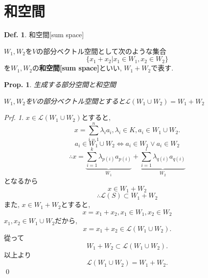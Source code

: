 \documentclass[a4paper,10pt,report]{amsart}
\theoremstyle{plain}
\newtheorem{prop}{Prop.}[section]
\theoremstyle{definition}
\newtheorem{defn}{Def.}[section]
\theoremstyle{remark}
\newtheorem{prf}{Prf.}
\begin{document}
\section{和空間}
\begin{leftbar}
    \begin{defn}和空間[sum space]\par
        \(W_{1},W_{2}\)を\(V\)の部分ベクトル空間として次のような集合
        \begin{equation}
            \{x_{1}+x_{2}|x_{1}\in W_{1},x_{2}\in W_{2}\}
        \end{equation}
        を\(W_{1},W_{2}\)の\textbf{和空間[sum space]}といい, \(W_{1}+W_{2}\)で表す.
    \end{defn}
\end{leftbar}
\begin{leftbar}
    \begin{prop}生成する部分空間と和空間\par
        \(W_{1},W_{2}\)を\(V\)の部分ベクトル空間とすると\(\mathcal{L}(W_{1}\cup{}W_{2})=W_{1}+W_{2} \)
    \end{prop}
\end{leftbar}
\begin{prf}
    \(x\in\mathcal{L}(W_{1}\cup W_{2})\)とすると, 
        \begin{equation*}
            x=\sum_{i=1}^{n}\lambda_{i}a_{i},\lambda_{i}\in K,a_{i}\in W_{1}\cup W_{2}.
        \end{equation*}
        \begin{equation*}
            a_{i}\in W_{1}\cup W_{2}\Leftrightarrow a_{i}\in W_{1}\vee a_{i}\in W_{2}
        \end{equation*}
        \begin{equation*}
            \therefore x=\underset{W_{1}}{\underbrace{\sum_{i=1}^{k}\lambda_{p(i)}a_{p(i)}}}+\underset{W_{2}}{\underbrace{\sum_{i=1}^{l}\lambda_{q(i)}a_{q(i)}}}
        \end{equation*}
        となるから
        \begin{equation*}
            x\in W_{1}+W_{2}
        \end{equation*}
        \begin{equation*}
            \therefore \mathcal{L}(S)\subset W_{1}+W_{2}
        \end{equation*}
        また, \(x\in W_{1}+W_{2}\)とすると, 
        \begin{equation*}
            x=x_{1}+x_{2},x_{1}\in W_{1},x_{2}\in W_{2}
        \end{equation*}
        \(x_{1},x_{2}\in W_{1}\cup W_{2}\)だから, 
        \begin{equation*}
            x=x_{1}+x_{2}\in \mathcal{L}(W_{1}\cup W_{2}).
        \end{equation*}
        從って
        \begin{equation*}
            W_{1}+W_{2}\subset \mathcal{L}(W_{1}\cup W_{2}).
        \end{equation*}
        以上より
        \begin{equation*}
            \mathcal{L}(W_{1}\cup W_{2})=W_{1}+W_{2}.
        \end{equation*}
        \qed{}
\end{prf}
\end{document}

